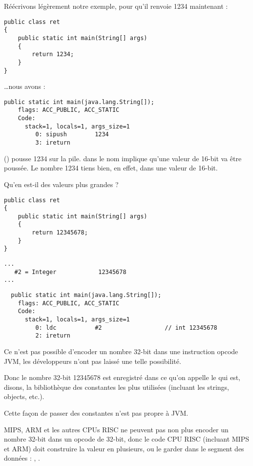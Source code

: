 Réécrivons légèrement notre exemple, pour qu'il renvoie 1234 maintenant :

\begin{lstlisting}[style=customjava]
public class ret
{
	public static int main(String[] args)
	{
		return 1234;
	}
}
\end{lstlisting}

\dots nous avons :

\begin{lstlisting}[caption=JDK 1.7 (excerpt)]
  public static int main(java.lang.String[]);
    flags: ACC_PUBLIC, ACC_STATIC
    Code:
      stack=1, locals=1, args_size=1
         0: sipush        1234
         3: ireturn       
\end{lstlisting}

 () pousse 1234 sur la pile.
 dans le nom implique qu'une valeur de 16-bit va être poussée. 
Le nombre 1234 tiens bien, en effet, dans une valeur de 16-bit.

Qu'en est-il des valeurs plus grandes ?

\begin{lstlisting}[style=customjava]
public class ret
{
	public static int main(String[] args) 
	{
		return 12345678;
	}
}
\end{lstlisting}

\begin{lstlisting}[caption=Constant pool]
...
   #2 = Integer            12345678
...
\end{lstlisting}

\begin{lstlisting}
  public static int main(java.lang.String[]);
    flags: ACC_PUBLIC, ACC_STATIC
    Code:
      stack=1, locals=1, args_size=1
         0: ldc           #2                  // int 12345678
         2: ireturn       
\end{lstlisting}

Ce n'est pas possible d'encoder un nombre 32-bit dans une instruction opcode JVM, 
les développeurs n'ont pas laissé une telle possibilité.

Donc le nombre 32-bit 12345678 est enregistré dans ce qu'on appelle le  qui est, disons, 
la bibliothèque des constantes les plus utilisées (incluant les strings, objects, etc.).

Cette façon de passer des constantes n'est pas propre à JVM.

MIPS, ARM et les autres CPUs RISC ne peuvent pas non plus encoder un nombre 32-bit 
dans un opcode de 32-bit, donc le code CPU RISC (incluant MIPS et ARM) doit construire la valeur 
en plusieurs, ou le garder dans le segment des données :
, .

